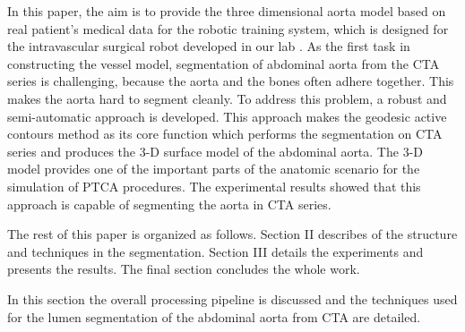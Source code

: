 
In this paper, the aim is to provide the three dimensional aorta model based on real patient's medical data for the robotic training system, which is designed for the intravascular surgical robot developed in our lab \cite{Ji2011CASIA}.
As the first task in constructing the vessel model, segmentation of abdominal aorta from the CTA series is challenging, because the aorta and the bones often adhere together.
This makes the aorta hard to segment cleanly.
To address this problem, a robust and semi-automatic approach is developed.
This approach makes the geodesic active contours method \cite{Caselles1997} as its core function which performs the segmentation on CTA series and produces the 3-D surface model of the abdominal aorta.
The 3-D model provides one of the important parts of the anatomic scenario for the simulation of PTCA procedures.
The experimental results showed that this approach is capable of segmenting the aorta in CTA series.

The rest of this paper is organized as follows.
Section II describes of the structure and techniques in the segmentation.
Section III details the experiments and presents the results.
The final section concludes the whole work. %

In this section the overall processing pipeline is discussed and the techniques used for the lumen segmentation of the abdominal aorta from CTA are detailed.

